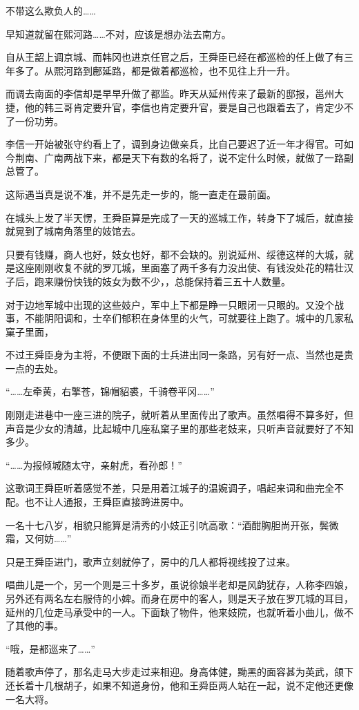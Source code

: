 不带这么欺负人的……

早知道就留在熙河路……不对，应该是想办法去南方。

自从王韶上调京城、而韩冈也进京任官之后，王舜臣已经在都巡检的任上做了有三年多了。从熙河路到鄜延路，都是做着都巡检，也不见往上升一升。

而调去南面的李信却是早早升做了都监。昨天从延州传来了最新的邸报，邕州大捷，他的韩三哥肯定要升官，李信也肯定要升官，要是自己也跟着去了，肯定少不了一份功劳。

李信一开始被张守约看上了，调到身边做亲兵，比自己要迟了近一年才得官。可如今荆南、广南两战下来，都是天下有数的名将了，说不定什么时候，就做了一路副总管了。

这际遇当真是说不准，并不是先走一步的，能一直走在最前面。

在城头上发了半天愣，王舜臣算是完成了一天的巡城工作，转身下了城后，就直接就晃到了城南角落里的妓馆去。

只要有钱赚，商人也好，妓女也好，都不会缺的。别说延州、绥德这样的大城，就是这座刚刚收复不就的罗兀城，里面塞了两千多有力没出使、有钱没处花的精壮汉子后，跑来赚份快钱的妓女为数不少，，总能保持着三五十人数量。

对于边地军城中出现的这些妓户，军中上下都是睁一只眼闭一只眼的。又没个战事，不能阴阳调和，士卒们郁积在身体里的火气，可就要往上跑了。城中的几家私窠子里面，

不过王舜臣身为主将，不便跟下面的士兵进出同一条路，另有好一点、当然也是贵一点的去处。

“……左牵黄，右擎苍，锦帽貂裘，千骑卷平冈……”

刚刚走进巷中一座三进的院子，就听着从里面传出了歌声。虽然唱得不算多好，但声音是少女的清越，比起城中几座私窠子里的那些老妓来，只听声音就要好了不知多少。

“……为报倾城随太守，亲射虎，看孙郎！”

这歌词王舜臣听着感觉不差，只是用着江城子的温婉调子，唱起来词和曲完全不配。也不让人通报，王舜臣直接跨进房中。

一名十七八岁，相貌只能算是清秀的小妓正引吭高歌：“酒酣胸胆尚开张，鬓微霜，又何妨……”

只是王舜臣进门，歌声立刻就停了，房中的几人都将视线投了过来。

唱曲儿是一个，另一个则是三十多岁，虽说徐娘半老却是风韵犹存，人称李四娘，另外还有两名左右服侍的小婢。而身在房中的客人，则是天子放在罗兀城的耳目，延州的几位走马承受中的一人。下面缺了物件，他来妓院，也就听着小曲儿，做不了其他的事。

“哦，是都巡来了……”

随着歌声停了，那名走马大步走过来相迎。身高体健，黝黑的面容甚为英武，颌下还长着十几根胡子，如果不知道身份，他和王舜臣两人站在一起，说不定他还更像一名大将。

